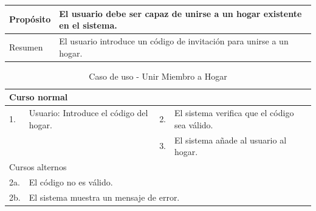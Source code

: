 \begin{table}[H]
    \centering
    \begin{tabular}{| m{} | m{} | m{} | m{} |}
        \hline
        Propósito & \multicolumn{3}{m{0.67\textwidth}|}{El usuario debe ser capaz de unirse a un hogar existente en el sistema.} \\ 
        \hline
        Resumen & \multicolumn{3}{m{0.67\textwidth}|}{El usuario introduce un código de invitación para unirse a un hogar.} \\ 
        \hline
    \end{tabular}
\end{table}

\begin{table}[H]
    \centering
    \begin{tabular}{| m{} | m{} | m{} | m{} |}
        \hline
        \multicolumn{4}{|m{0.9\textwidth}|}{Curso normal} \\ 
        \hline
        1. & Usuario: Introduce el código del hogar. 
        & 2. & El sistema verifica que el código sea válido. \\ 
        \hline
         & 
        & 3. & El sistema añade al usuario al hogar. \\ 
        \hline
        \multicolumn{4}{|m{0.9\textwidth}|}{Cursos alternos} \\ 
        \hline 
        2a. & \multicolumn{3}{l|}{El código no es válido.} \\ 
        \hline
        2b. & \multicolumn{3}{l|}{El sistema muestra un mensaje de error.} \\ 
        \hline
    \end{tabular}
    \caption{Caso de uso - Unir Miembro a Hogar}
\end{table}

\newpage


